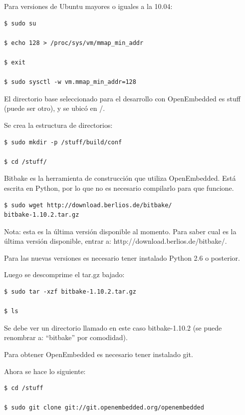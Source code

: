 Para versiones de Ubuntu mayores o iguales a la 10.04:

\begin{verbatim}
$ sudo su

$ echo 128 > /proc/sys/vm/mmap_min_addr

$ exit

$ sudo sysctl -w vm.mmap_min_addr=128
\end{verbatim}


\bigskip
El directorio base seleccionado para el desarrollo con OpenEmbedded es stuff (puede ser otro), y se ubicó en /.

\bigskip
Se crea la estructura de directorios:

\begin{verbatim}
$ sudo mkdir -p /stuff/build/conf

$ cd /stuff/
\end{verbatim}

Bitbake es la herramienta de construcción que utiliza OpenEmbedded. Está escrita en Python, por lo que no es necesario compilarlo para que funcione.

\begin{verbatim}
$ sudo wget http://download.berlios.de/bitbake/
bitbake-1.10.2.tar.gz
\end{verbatim}

Nota: esta es la última versión disponible al momento. Para saber cual es la última versión disponible, entrar a: http://download.berlios.de/bitbake/.

Para las nuevas versiones es necesario tener instalado Python 2.6 o posterior.

\bigskip
Luego se descomprime el tar.gz bajado:

\begin{verbatim}
$ sudo tar -xzf bitbake-1.10.2.tar.gz

$ ls
\end{verbatim}

Se debe ver un directorio llamado en este caso bitbake-1.10.2 (se puede renombrar a: “bitbake” por comodidad).

\bigskip
Para obtener OpenEmbedded es necesario tener instalado git.

\bigskip
Ahora se hace lo siguiente:

\begin{verbatim}
$ cd /stuff

$ sudo git clone git://git.openembedded.org/openembedded
\end{verbatim}

